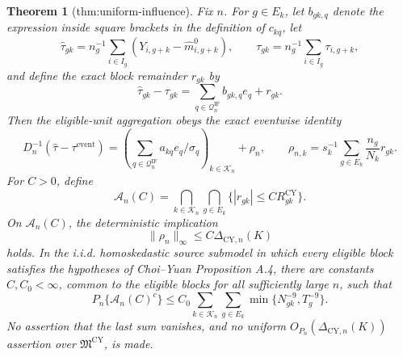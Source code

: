 \documentclass{article}
\newtheorem{theorem}{Theorem}
\begin{document}
\begin{theorem}[thm:uniform-influence]\label{thm:uniform-influence}
Fix \(n\).  For \(g\in E_k\), let \(b_{gk,q}\) denote the expression inside square brackets in the definition of \(c_{kq}\), let
\[
 \widehat\tau_{gk}=n_g^{-1}\sum_{i\in I_g}(Y_{i,g+k}-\widehat m^0_{i,g+k}),
 \qquad
 \tau_{gk}=n_g^{-1}\sum_{i\in I_g}\tau_{i,g+k},
\]
and define the exact block remainder \(r_{gk}\) by
\[
 \widehat\tau_{gk}-\tau_{gk}
 =\sum_{q\in\mathcal Q_n^{\mathrm{IF}}}b_{gk,q}e_q+r_{gk}.
\]
Then the eligible-unit aggregation obeys the exact eventwise identity
\[
 D_n^{-1}(\widehat\tau-\tau^{\mathrm{event}})
 =\left(\sum_{q\in\mathcal Q_n^{\mathrm{IF}}}a_{kq}e_q/\sigma_q\right)_{k\in\mathcal K_n}+\rho_n,
 \qquad
 \rho_{n,k}=s_k^{-1}\sum_{g\in E_k}\frac{n_g}{N_k}r_{gk}.
\]
For \(C>0\), define
\[
 \mathcal A_n(C)=\bigcap_{k\in\mathcal K_n}\bigcap_{g\in E_k}
 \{|r_{gk}|\le C R_{gk}^{\mathrm{CY}}\}.
\]
On \(\mathcal A_n(C)\), the deterministic implication
\[
 \|\rho_n\|_\infty\le C\Delta_{\mathrm{CY},n}(K)
\]
holds.  In the i.i.d. homoskedastic source submodel in which every eligible block satisfies the hypotheses of Choi--Yuan Proposition A.4, there are constants \(C,C_0<\infty\), common to the eligible blocks for all sufficiently large \(n\), such that
\[
 P_n\{\mathcal A_n(C)^c\}
 \le C_0\sum_{k\in\mathcal K_n}\sum_{g\in E_k}
 \min\{N_{gk}^{-9},T_g^{-9}\}.
\]
No assertion that the last sum vanishes, and no uniform \(O_{P_n}(\Delta_{\mathrm{CY},n}(K))\) assertion over \(\mathfrak M^{\mathrm{CY}}\), is made.
\end{theorem}
\end{document}
